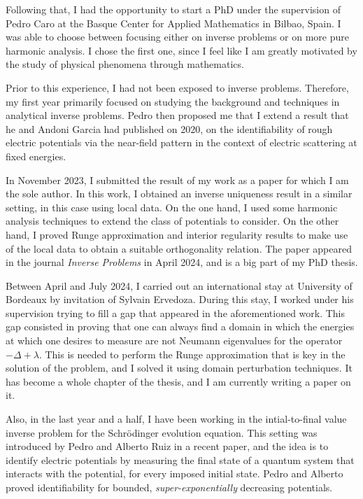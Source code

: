 \documentclass{article}
\begin{document}
Following that, I had the opportunity to start a PhD under the supervision of Pedro Caro at the Basque Center for Applied Mathematics in Bilbao, Spain. I was able to choose between focusing either on inverse problems or on more pure harmonic analysis. I chose the first one, since I feel like I am greatly motivated by the study of physical phenomena through mathematics.

Prior to this experience, I had not been exposed to inverse problems. Therefore, my first year primarily focused on studying the background and techniques in analytical inverse problems. Pedro then proposed me that I extend a result that he and Andoni Garcia had published on 2020, on the identifiability of rough electric potentials via the near-field pattern in the context of electric scattering at fixed energies.

In November 2023, I submitted the result of my work as a paper for which I am the sole author. In this work, I obtained an inverse uniqueness result in a similar setting, in this case using local data. On the one hand, I used some harmonic analysis techniques to extend the class of potentials to consider. On the other hand, I proved Runge approximation and interior regularity results to make use of the local data to obtain a suitable orthogonality relation. The paper appeared in the journal \textit{Inverse Problems} in April 2024, and is a big part of my PhD thesis.

Between April and July 2024, I carried out an international stay at University of Bordeaux by invitation of Sylvain Ervedoza. During this stay, I worked under his supervision trying to fill a gap that appeared in the aforementioned work. This gap consisted in proving that one can always find a domain in which the energies at which one desires to measure are not Neumann eigenvalues for the operator $-\Delta+\lambda$. This is needed to perform the Runge approximation that is key in the solution of the problem, and I solved it using domain perturbation techniques. It has become a whole chapter of the thesis, and I am currently writing a paper on it.

Also, in the last year and a half, I have been working in the intial-to-final value inverse problem for the Schr\"odinger evolution equation. This setting was introduced by Pedro and Alberto Ruiz in a recent paper, and the idea is to identify electric potentials by measuring the final state of a quantum system that interacts with the potential, for every imposed initial state. Pedro and Alberto proved identifiability for bounded, \textit{super-exponentially} decreasing potentials.
\end{document}
